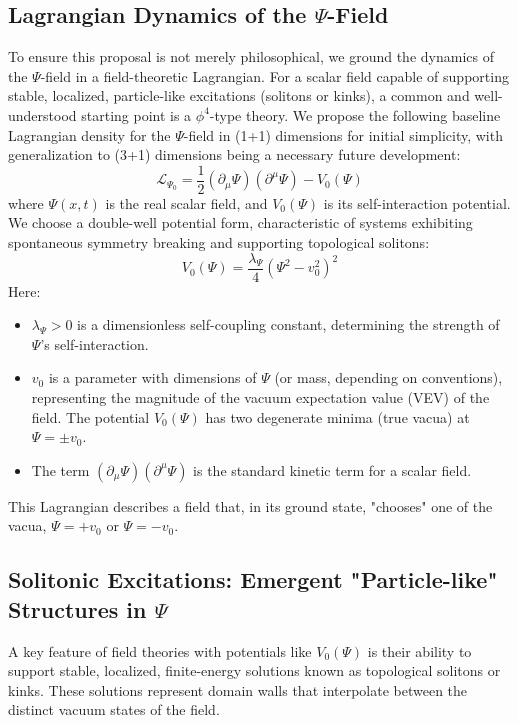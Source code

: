 \documentclass[11pt, a4paper]{book}
\begin{document}
\subsection{Lagrangian Dynamics of the $\Psi$-Field}
\label{ssec:psisubstrate_lagrangian}
To ensure this proposal is not merely philosophical, we ground the dynamics of the $\Psi$-field in a field-theoretic Lagrangian. For a scalar field capable of supporting stable, localized, particle-like excitations (solitons or kinks), a common and well-understood starting point is a $\phi^4$-type theory. We propose the following baseline Lagrangian density for the $\Psi$-field in (1+1) dimensions for initial simplicity, with generalization to (3+1) dimensions being a necessary future development:
\[ \mathcal{L}_{\Psi_0} = \frac{1}{2}(\partial_\mu \Psi)(\partial^\mu \Psi) - V_0(\Psi) \]
where $\Psi(x,t)$ is the real scalar field, and $V_0(\Psi)$ is its self-interaction potential. We choose a double-well potential form, characteristic of systems exhibiting spontaneous symmetry breaking and supporting topological solitons:
\[ V_0(\Psi) = \frac{\lambda_\Psi}{4}(\Psi^2 - v_0^2)^2 \]
Here:
\begin{itemize}
    \item $\lambda_\Psi > 0$ is a dimensionless self-coupling constant, determining the strength of $\Psi$'s self-interaction.
    \item $v_0$ is a parameter with dimensions of $\Psi$ (or mass, depending on conventions), representing the magnitude of the vacuum expectation value (VEV) of the field. The potential $V_0(\Psi)$ has two degenerate minima (true vacua) at $\Psi = \pm v_0$.
    \item The term $(\partial_\mu \Psi)(\partial^\mu \Psi)$ is the standard kinetic term for a scalar field.
\end{itemize}
This Lagrangian describes a field that, in its ground state, "chooses" one of the vacua, $\Psi = +v_0$ or $\Psi = -v_0$.

\subsection{Solitonic Excitations: Emergent "Particle-like" Structures in $\Psi$}
\label{ssec:psisubstrate_solitons}
A key feature of field theories with potentials like $V_0(\Psi)$ is their ability to support stable, localized, finite-energy solutions known as topological solitons or kinks. These solutions represent domain walls that interpolate between the distinct vacuum states of the field.
\end{document}
